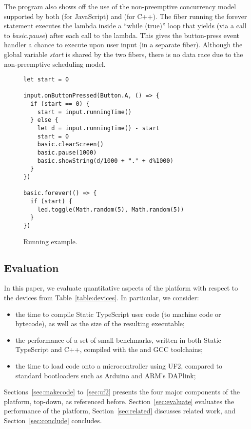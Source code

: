 The program also shows off the use of the non-preemptive concurrency
model supported by both \MC (for JavaScript) and \CO (for C++).
The fiber running the forever statement executes the lambda inside a ``while (true)''
loop that yields (via a call to \emph{basic.pause}) after each call to the lambda.
This gives the button-press event handler a chance to execute
upon user input (in a separate fiber). Although the global variable \emph{start} is
shared by the two fibers, there is no data race due to the non-preemptive
scheduling model.


\begin{figure}
\begin{lstlisting}
let start = 0

input.onButtonPressed(Button.A, () => {
  if (start == 0) {
    start = input.runningTime()
  } else {
    let d = input.runningTime() - start
    start = 0
    basic.clearScreen()
    basic.pause(1000)
    basic.showString(d/1000 + "." + d%1000)
  }
})

basic.forever(() => {
  if (start) {
    led.toggle(Math.random(5), Math.random(5))
  }
})
\end{lstlisting}
\caption{\label{fig:example}Running example.}
\end{figure}

\subsection{Evaluation}

In this paper, we evaluate quantitative aspects of the platform
with respect to the devices from Table~\ref{table:devices}. In particular, we
consider:
\begin{itemize}
\item the time to compile Static TypeScript user code (to machine code or bytecode),
       as well as the size of the resulting executable;
\item the performance of a set of small benchmarks, written in both Static TypeScript and C++,
      compiled with the \MC and GCC toolchains;
\item the time to load code onto a microcontroller using UF2, compared to standard bootloaders
      such as Arduino and ARM's DAPlink;
\end{itemize}


Sections~\ref{sec:makecode} to~\ref{sec:uf2} presents the four major components of the platform, top-down,
as referenced before. Section~\ref{sec:evaluate} evaluates the performance of the platform,
Section~\ref{sec:related} discusses related work, and Section~\ref{sec:conclude}
concludes.
